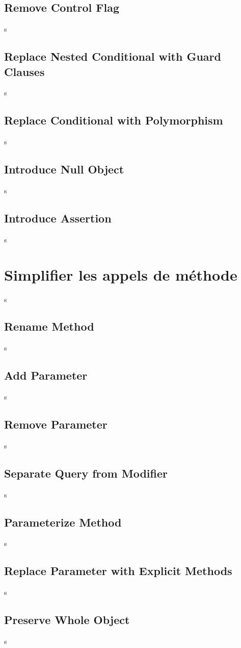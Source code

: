 \documentclass[a4paper,twoside,12pt,openright]{report}
\begin{document}
\subsection{Remove Control Flag}
s
\subsection{Replace Nested Conditional with Guard Clauses}
s
\subsection{Replace Conditional with Polymorphism}
s
\subsection{Introduce Null Object}
s
\subsection{Introduce Assertion}
s




\newpage
\section{Simplifier les appels de méthode}
s
\subsection{Rename Method}
s
\subsection{Add Parameter}
s
\subsection{Remove Parameter}
s
\subsection{Separate Query from Modifier}
s
\subsection{Parameterize Method}
s
\subsection{Replace Parameter with Explicit Methods}
s
\subsection{Preserve Whole Object}
s
\end{document}
